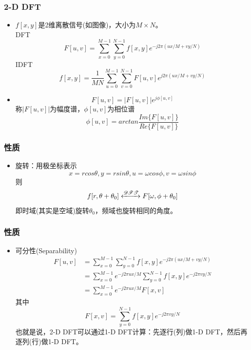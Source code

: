 \documentclass[CJKutf8,dvipsnames,table]{beamer}
\begin{document}
\begin{CJK*}{UTF8}{song}
  \begin{frame}
    \frametitle{2-D DFT}
    \begin{itemize}
    \item $f[x, y]$是2维离散信号(如图像)，大小为$M \times N$。\\
    DFT
    \[
    	F[u, v] = \sum_{x=0}^{M-1} \sum_{y=0}^{N-1} f[x, y] e^{-j2\pi (ux/M+vy/N)}
    \]
    IDFT
    \[
    	f[x, y] = \frac{1}{MN}\sum_{u=0}^{M-1} \sum_{v=0}^{N-1} F[u, v] e^{j2\pi (ux/M+vy/N)}    
    \]
    
    \item
    \[
    	F[u, v] = |F[u, v]|e^{j\phi[u, v]}
    \]
    称$|F[u, v]|$为幅度谱，$\phi[u,v]$为相位谱
    \[
    	\phi[u, v] = arctan\frac{\mathit{Im}\{F[u, v]\}}{\mathit{Re}\{F[u, v]\}}
    \]
    \end{itemize}
    
  \end{frame}  
  
  \begin{frame}
    \frametitle{性质}
    \begin{itemize}
    \item 旋转：用极坐标表示    
    \[
    	x=rcos\theta, y=rsin\theta, u = \omega cos\phi, v=\omega sin \phi
    \]
    则
    \[
    	f[r, \theta+\theta_0] \xleftrightarrow{\mathscr{DFT}} F[\omega, \phi+\theta_0]
    \]
    即时域(其实是空域)旋转$\theta_0$，频域也旋转相同的角度。
    \end{itemize}
  \end{frame}  
  
  \begin{frame}
    \frametitle{性质}
    \begin{itemize}
    \item 可分性(Separability)    
    \begin{align*}
    	F[u, v] & = \sum_{x=0}^{M-1} \sum_{y=0}^{N-1} f[x, y] e^{-j2\pi (ux/M+vy/N)} \\
	            & = \sum_{x=0}^{M-1} e^{-j2\pi ux/M} \sum_{y=0}^{N-1} f[x, y] e^{-j2\pi vy/N} \\
	            & = \sum_{x=0}^{M-1} e^{-j2\pi ux/M} F[x, v]
    \end{align*}
    其中
    \[
	    F[x, v] = \sum_{y=0}^{N-1} f[x, y] e^{-j2\pi vy/N}
    \]
    也就是说，{\color{red}2-D DFT可以通过1-D DFT计算：先逐行(列)做1-D DFT，然后再逐列(行)做1-D DFT}。    
    \end{itemize}
  \end{frame}  
    

\end{CJK*}
\end{document}
